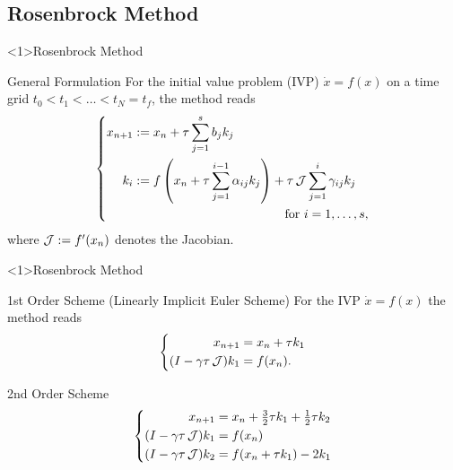 \subsection{Rosenbrock Method}

\begin{frame}<1>{Rosenbrock Method}
\begin{bigpicturecols}
  \begin{block}{General Formulation}
    For the initial value problem (IVP) $\dot x = f(x)$
    on a time grid $t_0 < t_1 < \ldots < t_N = t_f$,
    the method reads
    \begin{equation*}
    \left\{
    \begin{aligned}
      x_{n+1} &:= x_n + \tau \sum_{j=1}^s b_j k_j
      \\
      k_i &:= \begin{multlined}[t]
      f\left( x_n + \tau \sum_{j=1}^{i-1} \alpha_{ij} k_j \right) + \tau \Jac \sum_{j=1}^i \gamma_{ij} k_j
      \\
      \text{for } i = 1, \ldots, s
      ,
      \end{multlined}
    \end{aligned}
    \right.
    \end{equation*}
    where $\operatorname{\mathcal J} := f'(x_n)$ denotes the Jacobian.
  \end{block}
\column{\bigpicturewidth}
\end{bigpicturecols}
\end{frame}

\begin{frame}<1>{Rosenbrock Method}
\begin{bigpicturecols}
  \begin{block}{1st Order Scheme (Linearly Implicit Euler Scheme)}
    For the IVP $\dot x = f(x)$ the method reads
    \begin{equation*}
    \left\{
    \begin{aligned}
      x_{n+1} &= x_n + \tau k_1 \\
      (I - \gamma\tau \operatorname{\mathcal J}) k_1 &= f(x_n)
      .
    \end{aligned}
    \right.
    \end{equation*}
  \end{block}
  \begin{block}{2nd Order Scheme \parencite{Verwer1999}}
    \begin{equation*}
    \left\{
    \begin{aligned}
      x_{n+1} &= x_n + \tfrac{3}{2} \tau k_1 + \tfrac{1}{2} \tau k_2 \\
      (I - \gamma\tau \operatorname{\mathcal J}) k_1 &= f(x_n) \\
      (I - \gamma\tau \operatorname{\mathcal J}) k_2 &= f(x_n + \tau k_1) - 2k_1
    \end{aligned}
    \right.
    \end{equation*}
  \end{block}
\column{\bigpicturewidth}
\end{bigpicturecols}
\end{frame}

